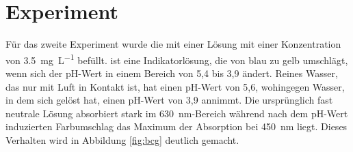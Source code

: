 % 



\section{\COTm Experiment}
\label{sec:cot}
Für das zweite Experiment wurde die \HSCs mit einer \BCG Lösung mit einer Konzentration von \SI{3,5}{\milli\gram\per\liter} befüllt. 
\BCG ist eine Indikatorlösung, die von blau zu gelb umschlägt, wenn sich der pH-Wert in einem Bereich von 5,4 bis 3,9 ändert. Reines Wasser, das nur mit Luft in Kontakt ist, hat einen pH-Wert von 5,6, wohingegen Wasser, in dem sich \COT gelöst hat, einen pH-Wert von 3,9 annimmt. Die ursprünglich fast neutrale Lösung absorbiert stark im \SI{630}{\nano\meter}-Bereich während nach dem pH-Wert induzierten Farbumschlag das Maximum der Absorption bei \SI{450}{\nano\meter} liegt. Dieses Verhalten wird in Abbildung \ref{fig:bcg} deutlich gemacht.

